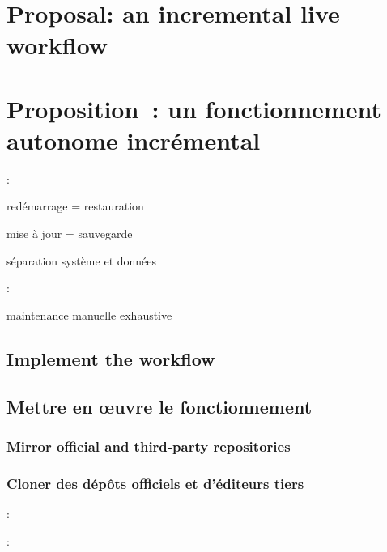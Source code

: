 \ml
{\chapter{Proposal: an incremental live workflow}}
{\chapter{Proposition : un fonctionnement autonome incrémental}}

:
\begin{itmz}
\item{
{redémarrage = restauration}}
\item{
{mise à jour = sauvegarde}}
\item{
{séparation système et données}}
\end{itmz}

:
\begin{itmz}
\item{
{maintenance manuelle exhaustive}}
\end{itmz}

\ml
{\section{Implement the workflow}}
{\section{Mettre en œuvre le fonctionnement}}

\ml
{\subsection{Mirror official and third-party repositories}}
{\subsection{Cloner des dépôts officiels et d’éditeurs tiers}}

:
\begin{itmz}
\item{\ml{\todo}
{\todo}}
\end{itmz}

:
\begin{itmz}
\item{\ml{\todo}
{\todo}}
\end{itmz}

